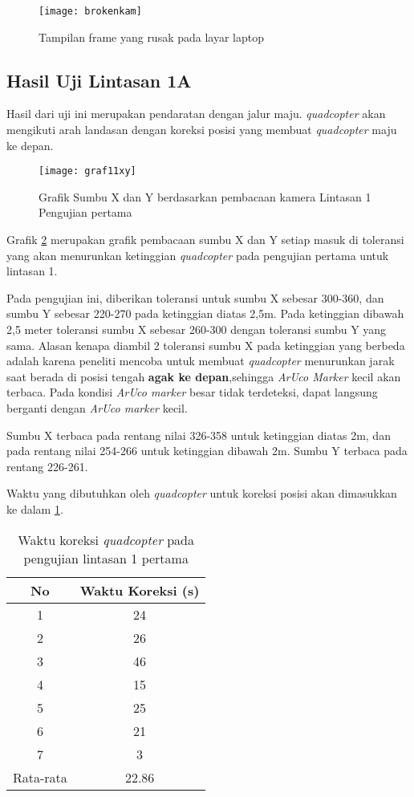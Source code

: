 \begin{figure}[H]
	\centering
	\texttt{[image: brokenkam]}
	\caption{Tampilan frame yang rusak pada layar laptop}
	\label{fig:brokenkam}
\end{figure}

\subsection{Hasil Uji Lintasan 1A}
Hasil dari uji ini merupakan pendaratan dengan jalur maju. \textit{quadcopter} akan mengikuti arah landasan dengan koreksi posisi yang membuat \textit{quadcopter} maju ke depan.

\begin{figure}[H]
	\centering
	\texttt{[image: graf11xy]}
	\caption{Grafik Sumbu X dan Y berdasarkan pembacaan kamera Lintasan 1 Pengujian pertama}
	\label{fig:graf11xy}
\end{figure}

Grafik \cref{fig:graf11xy} merupakan grafik pembacaan sumbu X dan Y setiap masuk di toleransi yang akan menurunkan ketinggian \textit{quadcopter} pada pengujian pertama untuk lintasan 1.

Pada pengujian ini, diberikan toleransi untuk sumbu X sebesar 300-360, dan sumbu Y sebesar 220-270 pada ketinggian diatas 2,5m. Pada ketinggian dibawah 2,5 meter toleransi sumbu X sebesar 260-300 dengan toleransi sumbu Y yang sama.
Alasan kenapa diambil 2 toleransi sumbu X pada  ketinggian yang berbeda adalah karena peneliti mencoba untuk membuat \textit{quadcopter} menurunkan jarak saat berada di posisi tengah \textbf{agak ke depan},sehingga \textit{ArUco Marker} kecil akan terbaca. Pada kondisi \textit{ArUco marker} besar tidak terdeteksi, dapat langsung berganti dengan \textit{ArUco marker} kecil.

Sumbu X terbaca pada rentang nilai 326-358 untuk ketinggian diatas 2m, dan pada rentang nilai 254-266 untuk ketinggian dibawah 2m. Sumbu Y terbaca pada rentang 226-261.

Waktu yang dibutuhkan oleh \textit{quadcopter} untuk koreksi posisi akan dimasukkan ke dalam \cref{tab:uji11}.

\begin{table}[H]
	\caption{Waktu koreksi \textit{quadcopter} pada pengujian lintasan 1 pertama}
	\label{tab:uji11}
	\centering
	\begin{tabular}{@{}|c|c|@{}}
		\hline
		No        & Waktu Koreksi (s) \\ \hline
		1         & 24                \\ \hline
		2         & 26                \\ \hline
		3         & 46                \\ \hline
		4         & 15                \\ \hline
		5         & 25                \\ \hline
		6         & 21                \\ \hline
		7         & 3                 \\ \hline
		Rata-rata & 22.86             \\ \hline
	\end{tabular}
\end{table}

